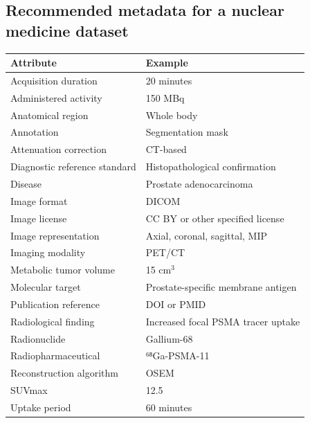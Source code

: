 \subsection{Recommended metadata for a nuclear medicine dataset}
\begin{longtable}{@{}p{}p{}@{}}
\toprule
\textbf{Attribute} & \textbf{Example} \\
\midrule
Acquisition duration & 20 minutes \\
Administered activity & 150 MBq \\
Anatomical region & Whole body \\
Annotation & Segmentation mask \\
Attenuation correction & CT-based \\
Diagnostic reference standard & Histopathological confirmation \\
Disease & Prostate adenocarcinoma \\
Image format & DICOM \\
Image license & CC BY or other specified license \\
Image representation & Axial, coronal, sagittal, MIP \\
Imaging modality & PET/CT \\
Metabolic tumor volume & 15 cm$^3$ \\
Molecular target & Prostate-specific membrane antigen \\
Publication reference & DOI or PMID \\
Radiological finding & Increased focal PSMA tracer uptake \\
Radionuclide & Gallium-68 \\
Radiopharmaceutical & ⁶⁸Ga-PSMA-11 \\
Reconstruction algorithm & OSEM \\
SUVmax & 12.5 \\
Uptake period & 60 minutes \\
\bottomrule
\end{longtable}

